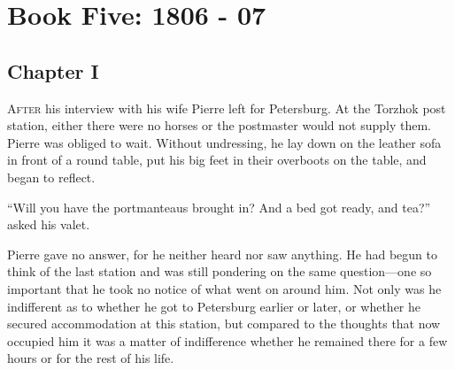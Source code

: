 \part*{Book Five: 1806 - 07}


\chapter*{Chapter I}
\ifaudio
{} 
\fi

\lettrine[lines=2, loversize=0.3, lraise=0]{\initfamily A}{fter}
his interview with his wife Pierre left for Petersburg. At
the Torzhok post station, either there were no horses or the
postmaster would not supply them. Pierre was obliged to
wait. Without undressing, he lay down on the leather sofa in
front of a round table, put his big feet in their overboots on
the table, and began to reflect.

``Will you have the portmanteaus brought in? And a bed got ready,
and tea?'' asked his valet.

Pierre gave no answer, for he neither heard nor saw anything. He
had begun to think of the last station and was still pondering on
the same question---one so important that he took no notice of
what went on around him. Not only was he indifferent as to
whether he got to Petersburg earlier or later, or whether he
secured accommodation at this station, but compared to the
thoughts that now occupied him it was a matter of indifference
whether he remained there for a few hours or for the rest of his
life.

